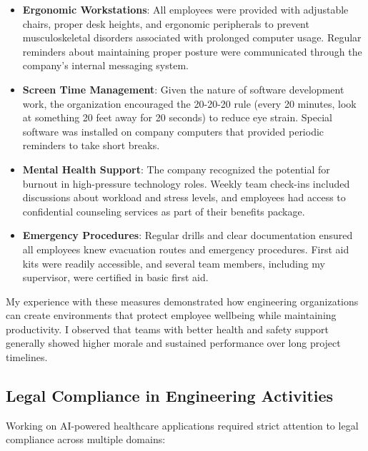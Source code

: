 \documentclass[12pt,a4paper]{article}
\begin{document}
\begin{itemize}
    \item \textbf{Ergonomic Workstations}: All employees were provided with adjustable chairs, proper desk heights, and ergonomic peripherals to prevent musculoskeletal disorders associated with prolonged computer usage. Regular reminders about maintaining proper posture were communicated through the company's internal messaging system.
    
    \item \textbf{Screen Time Management}: Given the nature of software development work, the organization encouraged the 20-20-20 rule (every 20 minutes, look at something 20 feet away for 20 seconds) to reduce eye strain. Special software was installed on company computers that provided periodic reminders to take short breaks.
    
    \item \textbf{Mental Health Support}: The company recognized the potential for burnout in high-pressure technology roles. Weekly team check-ins included discussions about workload and stress levels, and employees had access to confidential counseling services as part of their benefits package.
    
    \item \textbf{Emergency Procedures}: Regular drills and clear documentation ensured all employees knew evacuation routes and emergency procedures. First aid kits were readily accessible, and several team members, including my supervisor, were certified in basic first aid.
\end{itemize}

My experience with these measures demonstrated how engineering organizations can create environments that protect employee wellbeing while maintaining productivity. I observed that teams with better health and safety support generally showed higher morale and sustained performance over long project timelines.

\subsection{Legal Compliance in Engineering Activities}

Working on AI-powered healthcare applications required strict attention to legal compliance across multiple domains:
\end{document}
